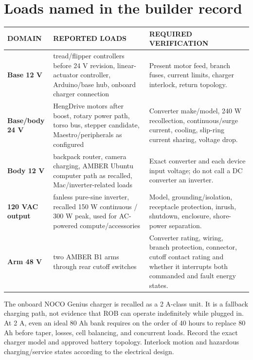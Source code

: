 \documentclass[10pt,openany]{book}
\begin{document}

\section{Loads named in the builder record}

\begin{tabularx}{\textwidth}{>{\robcondensed\bfseries}p{1.1in} p{1.7in} X}
\toprule
DOMAIN & REPORTED LOADS & REQUIRED VERIFICATION\\
\midrule
Base 12 V & tread/flipper controllers before 24 V revision, linear-actuator controller, Arduino/base hub, onboard charger connection & Present motor feed, branch fuses, current limits, charger interlock, return topology.\\
Base/body 24 V & HengDrive motors after boost, rotary power path, torso bus, stepper candidate, Maestro/peripherals as configured & Converter make/model, 240 W recollection, continuous/surge current, cooling, slip-ring current sharing, voltage drop.\\
Body 12 V & backpack router, camera charging, AMBER Ubuntu computer path as recalled, Mac/inverter-related loads & Exact converter and each device input voltage; do not call a DC converter an inverter.\\
120 VAC output & fanless pure-sine inverter, recalled 150 W continuous / 300 W peak, used for AC-powered compute/accessories & Model, grounding/isolation, receptacle protection, inrush, shutdown, enclosure, shore-power separation.\\
Arm 48 V & two AMBER B1 arms through rear cutoff switches & Converter rating, wiring, branch protection, connector, cutoff contact rating and whether it interrupts both commanded and fault energy states.\\
\bottomrule
\end{tabularx}

The onboard NOCO Genius charger is recalled as a 2 A-class unit. It is a fallback charging path, not evidence that ROB can operate indefinitely while plugged in. At 2 A, even an ideal 80 Ah bank requires on the order of 40 hours to replace 80 Ah before taper, losses, cell balancing, and concurrent loads. Record the exact charger model and approved battery topology. Interlock motion and hazardous charging/service states according to the electrical design.
\end{document}
